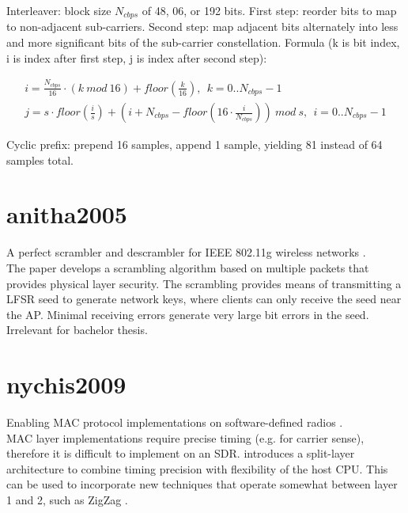 Interleaver: block size $N_{cbps}$ of 48, 06, or 192 bits. First step: reorder bits to map to non-adjacent sub-carriers. Second step: map adjacent bits alternately into less and more significant bits of the sub-carrier constellation. Formula (k is bit index, i is index after first step, j is index after second step):

\begin{align}
  i = \frac{N_{cbps}}{16} \cdot (k ~mod ~16) + floor(\frac{k}{16}), ~~k = 0 .. N_{cbps} - 1 \\
  j = s \cdot floor(\frac{i}{s}) + (i + N_{cbps} - floor(16 \cdot \frac{i}{N_{cbps}})) ~mod ~s, ~~i = 0 .. N_{cbps} - 1  \label{eqn:interleaving}
\end{align}

Cyclic prefix: prepend 16 samples, append 1 sample, yielding 81 instead of 64 samples total.



\section{anitha2005}

A perfect scrambler and descrambler for IEEE 802.11g wireless networks \cite{anitha2005}.\\

The paper develops a scrambling algorithm based on multiple packets that provides physical layer security. The scrambling provides means of transmitting a LFSR seed to generate network keys, where clients can only receive the seed near the AP. Minimal receiving errors generate very large bit errors in the seed. Irrelevant for bachelor thesis.



\section{nychis2009}

Enabling MAC protocol implementations on software-defined radios \cite{nychis2009}.\\

MAC layer implementations require precise timing (e.g. for carrier sense), therefore it is difficult to implement on an SDR. \cite{nychis2009} introduces a split-layer architecture to combine timing precision with flexibility of the host CPU. This can be used to incorporate new techniques that operate somewhat between layer 1 and 2, such as ZigZag \cite{gollakota2008}.


